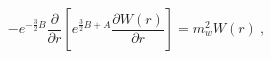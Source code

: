 \begin{equation}
-e^{-\frac{3}{2}B}\frac{\partial}{\partial r}
\left[e^{\frac{3}{2}B+A}\frac{\partial
W(r)}{\partial r}\right] = m_w^2 W(r)~,
\end{equation}

